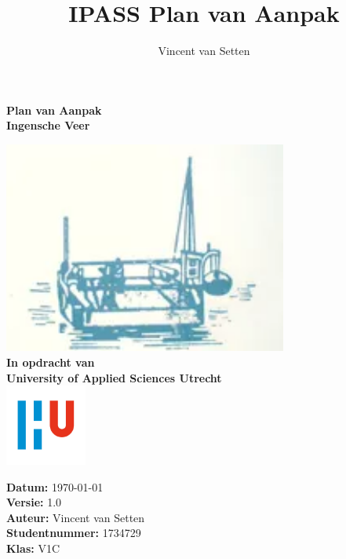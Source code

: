 \documentclass{article}
\title{IPASS Plan van Aanpak}
\author{Vincent van Setten}
\begin{document}
\begin{titlepage}
    \begin{center}
        \vspace*{.6cm}
        \Huge
        \textbf{Plan van Aanpak }\\
        \vspace{0.2cm}
        \LARGE 
        \textbf{Ingensche Veer} \\
  
        \normalsize
  
  
        \vspace{1cm}
        \includegraphics[width=0.7\textwidth]{images/iv.png}
        \vspace{1cm}
        \Large\\
        \textbf{In opdracht van}\\
        \large
        \textbf{University of Applied Sciences Utrecht} \\
        \includegraphics[width=0.2\textwidth]{images/logouni.jpg}
  
        \vfill
      \end{center}
      \textbf{Datum:} \today \\
      \textbf{Versie:} 1.0 \\
      \textbf{Auteur:} Vincent van Setten \\
      \textbf{Studentnummer:} 1734729 \\
      \textbf{Klas:} V1C\\
  
  \end{titlepage}
  
\end{document}
